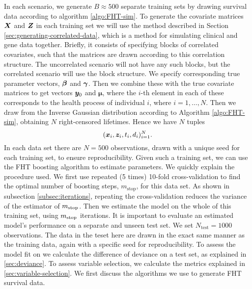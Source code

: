 In each scenario, we generate $B\approx500$ separate training sets by drawing survival data according to algorithm \ref{algo:FHT-sim}.
To generate the covariate matrices $\bm{X}$ and $\bm{Z}$ in each training set we will use the method described in Section \ref{sec:generating-correlated-data}, which is a method for simulating clinical and gene data together.
Briefly, it consists of specifying blocks of correlated covariates, such that the matrices are drawn according to this correlation structure.
The uncorrelated scenario will not have any such blocks, but the correlated scenario will use the block structure.
We specify corresponding true parameter vectors, $\boldsymbol{\beta}$ and $\boldsymbol{\gamma}$.
Then we combine these with the true covariate matrices to get vectors $\bm{y}_0$ and $\boldsymbol{\mu}$, where the $i$-th element in each of these corresponds to the health process of individual $i$, where $i=1,\ldots,N$.
Then we draw from the Inverse Gaussian distribution according to Algorithm \ref{algo:FHT-sim}, obtaining $N$ right-censored lifetimes.
Hence we have $N$ tuples 
\begin{equation*}
    (\bm{x}_i,\bm{z}_i,t_i,d_i)_{i=1}^{N}.
\end{equation*}
In each data set there are $N=500$ observations, drawn with a unique seed for each training set, to ensure reproducibility.
Given such a training set, we can use the FHT boosting algorithm to estimate parameters.
We quickly explain the procedure used.
We first use repeated (5 times) 10-fold cross-validation to find the optimal number of boosting steps, $m_{\text{stop}}$, for this data set.
As shown in subsection \ref{subsec:iterations}, repeating the cross-validation reduces the variance of the estimator of $m_{\text{stop}}$.
Then we estimate the model on the whole of this training set, using $m_{\text{stop}}$ iterations.
It is important to evaluate an estimated model's performance on a separate and unseen test set.
We set $N_{\text{test}}=1000$ observations.
The data in the teset here are drawn in the exact same manner as the training data, again with a specific seed for reproducibility.
To assess the model fit on we calculate the difference of deviance on a test set, as explained in \ref{sec:deviance}.
To assess variable selection, we calculate the metrics explained in \ref{sec:variable-selection}.
We first discuss the algorithms we use to generate FHT survival data.

